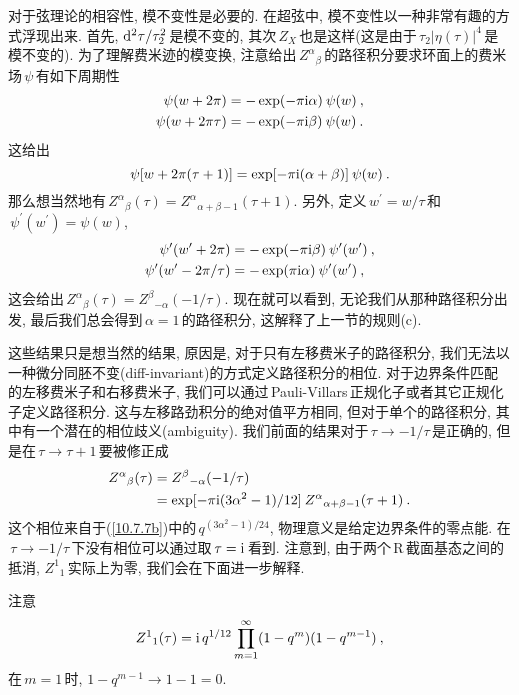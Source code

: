 对于弦理论的相容性, 模不变性是必要的. 在超弦中, 模不变性以一种非常有趣的方式浮现出来. 首先, $\mathrm{d}^{2}\tau/\tau_{2}^{2}\,$是模不变的, 其次\,$Z_{X}\,$也是这样(这是由于$\,\tau_{2}\lvert\eta(\tau)\rvert^{4}\,$是模不变的). 为了理解费米迹的模变换, 注意给出$\,Z^{\alpha}{}_{\beta}\,$的路径积分要求环面上的费米场$\,\psi\,$有如下周期性
\begin{subequations}
    \begin{align}
        \psi(w+2\pi)&= -\exp(-\pi\mathrm{i}\alpha)\: \psi(w) \:, \label{10.7.11a} \\
        \psi(w+2\pi \tau)&= -\exp(-\pi\mathrm{i}\beta)\:\psi(w) \:. \label{10.7.11b}
    \end{align} \label{10.7.11}
\end{subequations}
这给出
\begin{equation}
    \psi[w+2\pi(\tau+1)] = \exp [-\pi\mathrm{i}(\alpha+\beta)]\:\psi(w) \:. \label{10.7.12}
\end{equation}
那么想当然地有$\,Z^{\alpha}{}_{\beta}(\tau)=Z^{\alpha}{}_{\alpha+\beta-1}(\tau+1)$. 另外, 定义$\,w^{\prime}=w/\tau\,$和$\,\psi^{\prime}(w^{\prime})=\psi(w)$,
\begin{subequations}
    \begin{align}
        \psi^{\prime}(w^{\prime}+2\pi)&= -\exp(-\pi\mathrm{i}\beta)\: \psi^{\prime}(w^{\prime}) \:, \label{10.7.13a} \\
        \psi^{\prime}(w^{\prime}-2\pi/\tau)&= -\exp(\pi\mathrm{i}\alpha)\:\psi^{\prime}(w^{\prime}) \:, \label{10.7.13b}
    \end{align} \label{10.7.13}
\end{subequations}
这会给出$\,Z^{\alpha}{}_{\beta}(\tau) = Z^{\beta}{}_{-\alpha}(-1/\tau)$. 现在就可以看到, 无论我们从那种路径积分出发, 最后我们总会得到$\,\alpha=1\,$的路径积分, 这解释了上一节的规则(c).

这些结果只是想当然的结果, 原因是, 对于只有左移费米子的路径积分, 我们无法以一种微分同胚不变(diff-invariant)的方式定义路径积分的相位. 对于边界条件匹配的左移费米子和右移费米子, 我们可以通过\,Pauli-Villars\,正规化子或者其它正规化子定义路径积分. 这与左移路劲积分的绝对值平方相同, 但对于单个的路径积分, 其中有一个潜在的相位歧义(ambiguity). 我们前面的结果对于$\,\tau\to-1/\tau\,$是正确的, 但是在$\,\tau\to\tau+1\,$要被修正成
\begin{align}
    Z^{\alpha}{}_{\beta}(\tau) &= Z^{\beta}{}_{-\alpha}(-1/\tau) \nonumber\\
    &= \exp[-\pi\mathrm{i}(3\alpha^{2}-1)/12]\:Z^{\alpha}{}_{\alpha+\beta-1}(\tau+1)\:. \label{10.7.14}
\end{align}
这个相位来自于(\ref{10.7.7b})中的$\,q^{(3\alpha^{2}-1)/24}$, 物理意义是给定边界条件的零点能. 在$\,\tau\to-1/\tau\,$下没有相位可以通过取$\,\tau=\mathrm{i}\,$看到. 注意到, 由于两个\,R\,截面基态之间的抵消, $Z^{1}{}_{1}\,$实际上为零, 我们会在下面进一步解释.
\begin{tcolorbox}
注意
\[
Z^{1}{}_{1}(\tau) = \mathrm{i}\,q^{1/12}\prod_{m=1}^{\infty}(1-q^{m})(1-q^{m-1}) \:,
\]
在$\,m=1\,$时, $1-q^{m-1}\to 1-1 =0$.
\end{tcolorbox}

